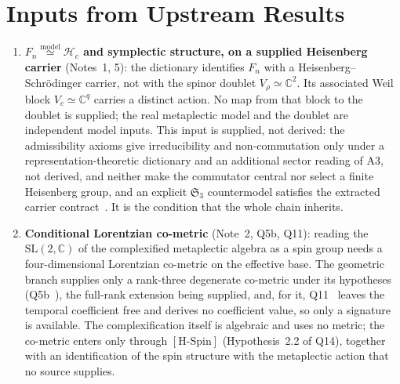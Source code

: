 \documentclass[11pt,a4paper]{article}
\theoremstyle{definition}
\newcommand{\SL}{\mathrm{SL}}
\newcommand{\Vr}{V_\rho}
\newcommand{\HSpin}{\ensuremath{[\mathrm{H\text{-}Spin}]}}
\begin{document}
  \section{Inputs from Upstream Results}
    \label{sec:inputs}

    \begin{enumerate}
      \item \textbf{$F_n \overset{\mathrm{model}}{\simeq} \mathcal{H}_c$ and symplectic structure, on a supplied Heisenberg carrier}
      (Notes~1, 5):
      the dictionary identifies $F_n$ with a Heisenberg--Schr\"odinger carrier, not with the
      spinor doublet $\Vr \simeq \mathbb{C}^2$.
      Its associated Weil block $V_c \simeq \mathbb{C}^q$ carries a distinct action.
      No map from that block to the doublet is supplied; the real metaplectic model and the doublet
      are independent model inputs.
      This input is supplied, not derived: the admissibility axioms give irreducibility and
      non-commutation only under a representation-theoretic dictionary and an additional sector reading of A3,
      not derived, and neither make the commutator central nor select a finite Heisenberg group,
      and an explicit $\mathfrak{S}_3$ countermodel satisfies the extracted carrier
      contract~\cite{Beau2026m, Beau2026HeisenbergStructure}.
      It is the condition that the whole chain inherits.

      \item \textbf{Conditional Lorentzian co-metric} (Note~2, Q5b, Q11):
      reading the $\SL(2,\mathbb{C})$ of the complexified metaplectic algebra as a spin group needs a
      four-dimensional Lorentzian co-metric on the effective base.
      The geometric branch supplies only a rank-three degenerate co-metric under its hypotheses
      (Q5b~\cite{Beau2026q5b}),
      the full-rank extension being supplied, and, for it, Q11~\cite{Beau2026q11} leaves the temporal coefficient
      free and derives no coefficient value, so only a
      signature is available.
      The complexification itself is algebraic and uses no metric; the co-metric enters only through
      \HSpin{} (Hypothesis~2.2 of Q14), together with an identification of the spin structure with the metaplectic
      action that no source supplies.


\end{enumerate}
\end{document}

